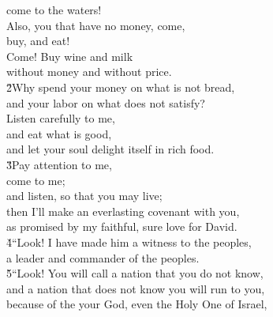 \begin{poetry}
\poemll    come to the waters! \\
\poeml Also, you that have no money, come, \\
\poemll    buy, and eat! \\
\poeml Come! Buy wine and milk \\
\poemll    without money and without price. \\
\poeml \v{2}Why spend your money on what is not bread, \\
\poemll    and your labor on what does not satisfy? \\
\poeml Listen carefully to me, \\
\poemll    and eat what is good, \\
\poemlll       and let your soul delight itself in rich food. \\
\poeml \v{3}Pay attention to me, \\
\poemll    come to me; \\
\poemlll       and listen, so that you may live; \\
\poeml then I'll make an everlasting covenant with you, \\
\poemll    as promised by my faithful, sure love for David. \\
\poeml \v{4}``Look! I have made him a witness to the peoples, \\
\poemll    a leader and commander of the peoples. \\
\poeml \v{5}``Look! You will call a nation that you do not know, \\
\poemll    and a nation that does not know you will run to you, \\
\poeml because of the  your God, even the Holy One of Israel, \\

\end{poetry}
